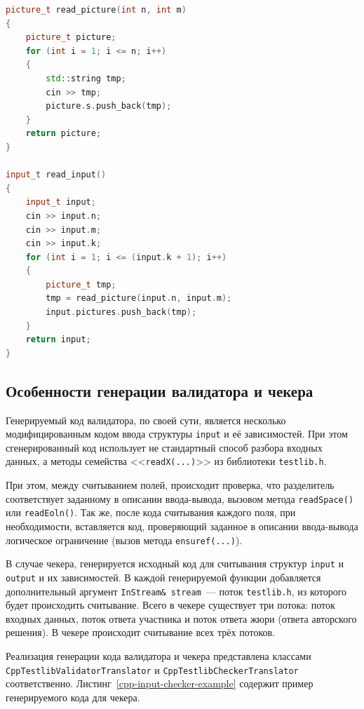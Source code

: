\documentclass[times,specification,annotation]{style/itmo-student-thesis/itmo-student-thesis}
\begin{document}
\begin{lstlisting}[float=!h,caption={Пример сгенерированного кода ввода},label={cpp-input-example},language=c++]
picture_t read_picture(int n, int m)
{
    picture_t picture;
    for (int i = 1; i <= n; i++)
    {
        std::string tmp;
        cin >> tmp;
        picture.s.push_back(tmp);
    }
    return picture;
}

input_t read_input()
{
    input_t input;
    cin >> input.n;
    cin >> input.m;
    cin >> input.k;
    for (int i = 1; i <= (input.k + 1); i++)
    {
        picture_t tmp;
        tmp = read_picture(input.n, input.m);
        input.pictures.push_back(tmp);
    }
    return input;
}
\end{lstlisting}

\subsection{Особенности генерации валидатора и чекера}

Генерируемый код валидатора, по своей сути, является несколько модифицированным кодом ввода структуры \texttt{input} и её зависимостей. При этом сгенерированный код использует не стандартный способ разбора входных данных, а методы семейства <<\texttt{readX(...)}>> из библиотеки \texttt{testlib.h}. 

При этом, между считыванием полей, происходит проверка, что разделитель соответствует заданному в описании ввода-вывода, вызовом метода \texttt{readSpace()} или \texttt{readEoln()}. Так же, после кода считывания каждого поля, при необходимости, вставляется код, проверяющий заданное в описании ввода-вывода логическое ограничение (вызов метода \texttt{ensuref(...)}).

В случае чекера, генерируется исходный код для считывания структур \texttt{input} и \texttt{output} и их зависимостей. В каждой генерируемой функции добавляется дополнительный аргумент \texttt{InStream\& stream}~--- поток \texttt{testlib.h}, из которого будет происходить считывание. Всего в чекере существует три потока: поток входных данных, поток ответа участника и поток ответа жюри (ответа авторского решения). В чекере происходит считывание всех трёх потоков.

Реализация генерации кода валидатора и чекера представлена классами \texttt{CppTestlibValidatorTranslator} и \texttt{CppTestlibCheckerTranslator} соответственно. Листинг~\ref{cpp-input-checker-example} содержит пример генерируемого кода для чекера.
\end{document}
